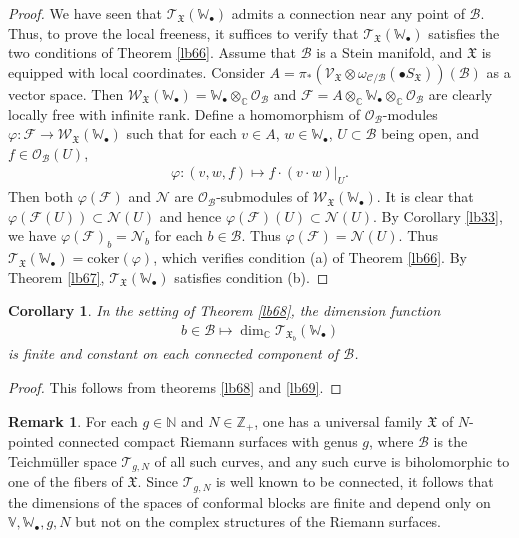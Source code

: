 \documentclass[12pt,a4paper,notitlepage]{report}
\theoremstyle{definition}
\newtheorem{rem}[df]{Remark}
\theoremstyle{plain}
\newtheorem{co}[df]{Corollary}
\newcommand{\fk}{\mathfrak}
\newcommand{\mc}{\mathcal}
\newcommand{\scr}{\mathscr}
\newcommand{\blt}{\bullet}
\newcommand{\coker}{\mathrm{coker}}
\newcommand{\Vbb}{\mathbb V}
\newcommand{\Wbb}{\mathbb W}
\newcommand{\Cbb}{\mathbb C}
\newcommand{\Nbb}{\mathbb N}
\newcommand{\Zbb}{\mathbb Z}
\numberwithin{equation}{section}
\begin{document}
\begin{proof}
We have seen that $\scr T_{\fk X}(\Wbb_\blt)$ admits a connection near any point of $\mc B$. Thus, to prove the local freeness, it suffices to verify that $\scr T_{\fk X}(\Wbb_\blt)$ satisfies the two conditions of Theorem \ref{lb66}. Assume that $\mc B$ is a Stein manifold, and $\fk X$ is equipped with local coordinates.  Consider  $A=\pi_*(\scr V_{\fk X}\otimes\omega_{\mc C/\mc B}(\blt S_{\fk X}))(\mc B)$ as a vector space. Then $\scr W_{\fk X}(\Wbb_\blt)=\Wbb_\blt\otimes_\Cbb\scr O_{\mc B}$ and $\scr F=A\otimes_\Cbb\Wbb_\blt\otimes_\Cbb\scr O_{\mc B}$ are clearly locally free with infinite rank. Define a homomorphism of $\scr O_{\mc B}$-modules $\varphi:\scr F\rightarrow\scr W_{\fk X}(\Wbb_\blt)$ such that for each $v\in A$, $w\in\Wbb_\blt$, $U\subset \mc B$ being open, and $f\in\scr O_{\mc B}(U)$,
\begin{align*}
\varphi: (v,w,f)\mapsto f\cdot(v\cdot w)|_U.
\end{align*}
Then both $\varphi(\scr F)$ and $\scr N$ are $\scr O_{\mc B}$-submodules of $\scr W_{\fk X}(\Wbb_\blt)$. It is clear that $\varphi(\scr F(U))\subset\scr N(U)$ and hence $\varphi(\scr F)(U)\subset\scr N(U)$. By Corollary \ref{lb33}, we have $\varphi(\scr F)_b=\scr N_b$ for each $b\in\mc B$. Thus $\varphi(\scr F)=\scr N(U)$. Thus $\scr T_{\fk X}(\Wbb_\blt)=\coker(\varphi)$, which verifies condition (a) of Theorem \ref{lb66}. By Theorem \ref{lb67}, $\scr T_{\fk X}(\Wbb_\blt)$ satisfies condition (b). 
\end{proof}




\begin{co}\label{lb119}
In the setting of Theorem \ref{lb68}, the dimension function
\begin{align*}
b\in\mc B\mapsto \dim_\Cbb\scr T_{\fk X_b}(\Wbb_\blt)
\end{align*}
is finite and  constant on each connected component of $\mc B$.
\end{co}

\begin{proof}
This follows from theorems \ref{lb68} and \ref{lb69}.
\end{proof}

\begin{rem}
For each $g\in\Nbb$ and $N\in\Zbb_+$, one has a universal family $\fk X$ of $N$-pointed connected   compact Riemann surfaces with genus $g$, where $\mc B$ is the Teichm\"uller space $\mc T_{g,N}$ of all such curves, and any such curve is biholomorphic to one of the fibers of $\fk X$. Since $\mc T_{g,N}$ is well known to be connected, it follows that the dimensions of the spaces of conformal blocks are finite and depend only on $\Vbb,\Wbb_\blt,g,N$ but not on the complex structures of the Riemann surfaces.
\end{rem}
\end{document}
